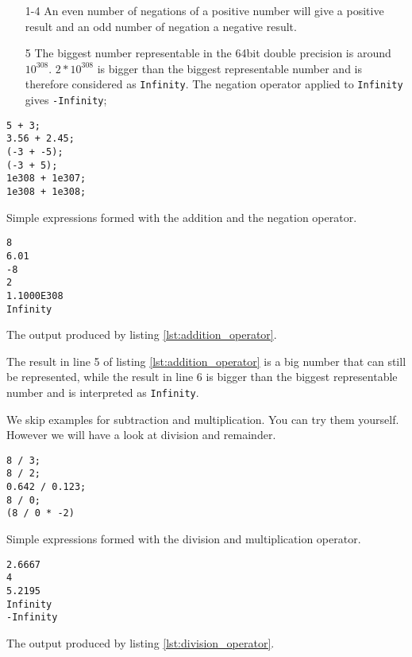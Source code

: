 \begin{enumerate}
\item[1-4] An even number of negations of a positive number will give a positive result and an odd number of negation a negative result.
\item[5] The biggest number representable in the 64bit double precision is around $10^{308}$. $2*10^{308}$ is bigger than the biggest representable number and is therefore considered as {\tt Infinity}. The negation operator applied to {\tt Infinity} gives {\tt -Infinity};
\end{enumerate}

\begin{listing}[H]
\begin{verbatim}
5 + 3;
3.56 + 2.45;
(-3 + -5);
(-3 + 5);
1e308 + 1e307;
1e308 + 1e308;
\end{verbatim}
\caption{Simple expressions formed with the addition and the negation operator.}
\label{lst:addition_operator}
\end{listing}

\begin{listing}[H]
\begin{verbatim}
8
6.01
-8
2
1.1000E308
Infinity
\end{verbatim}
\caption{The output produced by listing \ref{lst:addition_operator}.}
\label{lst:addition_operator_results}
\end{listing}

The result in line 5 of listing \ref{lst:addition_operator} is a big number that can still be represented, while the result in line 6 is bigger than the biggest representable number and is interpreted as {\tt Infinity}.

We skip examples for subtraction and multiplication. You can try them yourself. However we will have a look at division and remainder. 

\begin{listing}[H]
\begin{verbatim}
8 / 3;
8 / 2;
0.642 / 0.123;
8 / 0;
(8 / 0 * -2)
\end{verbatim}
\caption{Simple expressions formed with the division and multiplication operator.}
\label{lst:division_operator}
\end{listing}

\begin{listing}[H]
\begin{verbatim}
2.6667
4
5.2195
Infinity
-Infinity
\end{verbatim}
\caption{The output produced by listing \ref{lst:division_operator}.}
\label{lst:division_operator_results}
\end{listing}

